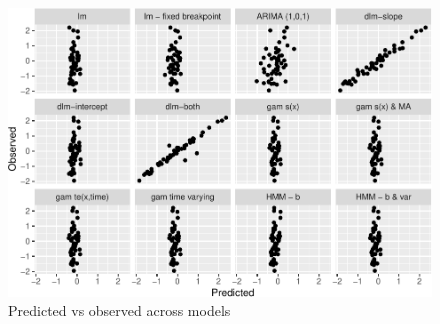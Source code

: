 \documentclass[]{article}
\begin{document}
\begin{figure}
\centering
\includegraphics{univariate-time-series-examples_files/figure-latex/unnamed-chunk-9-1.pdf}
\caption{Predicted vs observed across models}
\end{figure}
\end{document}
